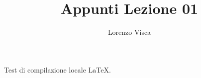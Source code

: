 \documentclass{article}
\title{Appunti Lezione 01}
\author{Lorenzo Visca}
\date{}
\begin{document}
\maketitle

Test di compilazione locale \LaTeX.
\end{document}
